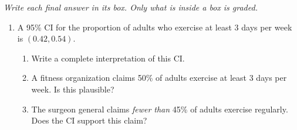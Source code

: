 \documentclass[10pt]{article}
\begin{document}
{\small\itshape Write each final answer in its box. Only what is inside a box is graded.}\par

\vspace{0.15in}

\begin{enumerate}

  \item A 95\% CI for the proportion of adults who exercise at least 3 days per week is
        $(0.42, 0.54)$.
        \begin{enumerate}[label=\alph*.]
          \item Write a complete interpretation of this CI. 
          \item A fitness organization claims 50\% of adults exercise at least 3 days per week.
                Is this plausible? 
          \item The surgeon general claims \emph{fewer than} 45\% of adults exercise regularly.
                Does the CI support this claim? 
        \end{enumerate}


\end{enumerate}
\end{document}
